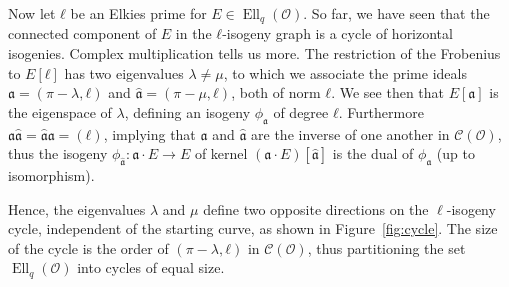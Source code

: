 \documentclass{llncs}
\newcommand{\Cl}{\mathcal{C}}
\renewcommand{\O}{\mathcal{O}}
\renewcommand{\frak}{\mathfrak}
\DeclareMathOperator{\Ell}{Ell}
\begin{document}
Now let $ℓ$ be an Elkies prime for $E\in\Ell_q(\O)$. So far, we have seen that the
connected component of $E$ in the $ℓ$-isogeny graph is a cycle of
horizontal isogenies. Complex multiplication tells us more. The
restriction of the Frobenius to $E[ℓ]$ has two eigenvalues $λ≠μ$, to
which we associate the prime ideals $\frak a=(π-λ,ℓ)$ and
$\hat{\frak a}=(π-μ,ℓ)$, both of norm $ℓ$. We see then that
$E[\frak a]$ is the eigenspace of $λ$, defining an isogeny
$ϕ_{\frak{a}}$ of degree $ℓ$. Furthermore
$\frak a\hat{\frak a} = \hat{\frak a}\frak a = (ℓ)$, implying that
$\frak a$ and $\hat{\frak a}$ are the inverse of one another in
$\Cl(\O)$, thus the isogeny $ϕ_{\hat{\frak a}}:\frak a·E→E$ of
kernel $(\frak a·E)[\hat{\frak a}]$ is the dual of $ϕ_{\frak a}$ (up
to isomorphism). 

Hence, 
the eigenvalues $λ$ and $μ$ define two opposite directions on the
$\ell$-isogeny cycle,
independent of the starting curve,
as shown in Figure~\ref{fig:cycle}.  
The size of the cycle is the order of $(π-λ,ℓ)$ in $\Cl(\O)$,
thus partitioning the set $\Ell_q(\O)$ into cycles of equal size.
\end{document}
